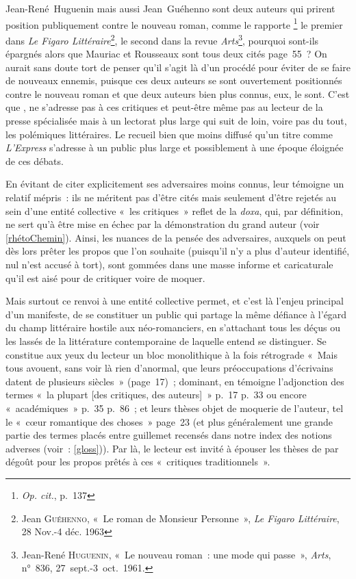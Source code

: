 \documentclass[12pt, a4paper]{article}
\begin{document}
Jean-René~Huguenin mais aussi Jean~Guéhenno sont deux auteurs qui prirent position publiquement contre le nouveau roman, comme le rapporte \galia\footnote{\textit{Op. cit.}, p.~137} le premier dans \textit{Le Figaro Littéraire}\footnote{Jean \textsc{Guéhenno}, «~Le roman de Monsieur Personne~»,\textit{ Le Figaro Littéraire}, 28 Nov.-4 déc. 1963}, le second dans la revue \textit{Arts}\footnote{Jean-René \textsc{Huguenin}, «~Le nouveau roman~: une mode qui passe~», \textit{Arts}, n°~836, 27~sept.-3~oct.~1961.}, pourquoi sont-ils épargnés alors que Mauriac et Rousseaux sont tous deux cités page~55~? 
On aurait sans doute tort de penser qu'il s'agit là d'un procédé pour éviter de se faire de nouveaux ennemis, puisque ces deux auteurs se sont ouvertement positionnés contre le nouveau roman et que deux auteurs bien plus connus, eux, le sont. C'est que \punr, ne s'adresse pas à ces critiques et peut-être même pas au lecteur de la presse spécialisée mais à un lectorat plus large qui suit de loin, voire pas du tout, les polémiques littéraires. Le recueil bien que moins diffusé qu'un titre comme \textit{L'Express} s'adresse à un public plus large et possiblement à une époque éloignée de ces débats. 

En évitant de citer explicitement ses adversaires moins connus, \robbe{} leur témoigne un relatif mépris~: ils ne méritent pas d'être cités mais seulement d'être rejetés au sein d'une entité collective «~les critiques~» reflet de la \textit{doxa}, qui, par définition, ne sert qu'à être mise en échec par la démonstration du grand auteur (voir \ref{rhétoChemin}). Ainsi, les nuances de la pensée des adversaires, auxquels on peut dès lors prêter les propos que l'on souhaite (puisqu'il n'y a plus d'auteur identifié, nul n'est accusé à tort), sont gommées dans une masse informe et caricaturale qu'il est aisé pour \robbe{} de critiquer voire de moquer. %

Mais surtout ce renvoi à une entité collective permet, et c'est là l'enjeu principal d'un manifeste, de se constituer un public qui partage la même défiance à l'égard du champ littéraire hostile aux néo-romanciers, en s'attachant tous les déçus ou les lassés de la littérature contemporaine de laquelle \robbe{} entend se distinguer. Se constitue aux yeux du lecteur un bloc monolithique à la fois rétrograde «~Mais tous avouent, sans voir là rien d’anormal, que leurs préoccupations d’écrivains datent de plusieurs siècles~» (page~17)~; dominant, en témoigne l'adjonction des termes «~la plupart [des critiques, des auteurs]~» p.~17 p.~33 ou encore «~académiques~» p.~35 p.~86~; et leurs thèses objet de moquerie de l'auteur, tel le «~cœur romantique des choses~» page~23 (et plus généralement une grande partie des termes placés entre guillemet recensés dans notre index des notions adverses (voir~: \ref{gloss})). Par là, le lecteur est invité à épouser les thèses de \punr{} par dégoût pour les propos prêtés à ces «~critiques traditionnels~».
\end{document}
